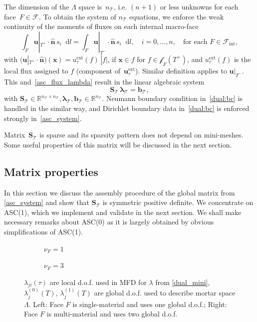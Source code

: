 \documentclass[12pt]{article}
\newcommand{\svginputw}[2][\linewidth]{\def\svgwidth{#1}} %
\newcommand{\vect}[1]{\boldsymbol{\mathbf{#1}}}
\newcommand{\bcell}{T}
\newcommand{\bmesh}{{\vect{\mathcal T}}}
\newcommand{\mmesh}{{\vect{\mathcal \tau}}}
\newcommand{\bfaces}[1][]{{\vect{\mathcal F}_{\text{#1}}}}
\newcommand{\mfaces}[1][]{{\vect{\mathcal f}_{\text{#1}}}}
\newcommand{\Rn}[1]{{\mathbb R^{#1}}}
\newcommand*\diff{\mathop{}\!\mathrm{d}}
\begin{document}
	The dimension of the $\Lambda$ space is~$n_\bmesh$, i.e. $(n+1)$ or less unknowns for each face~${F \in \bfaces}$.
	To obtain the system of $n_\bmesh$ equations, we enforce the weak continuity of the moments of  fluxes  on each internal macro-face
	\begin{equation}\label{flux_cont}
		\int_F \vect u|_{\bcell^+}\cdot\hat{\vect n}\,s_i \diff l = \int_F \vect u|_{\bcell^-}\cdot\hat{\vect n}\,s_i \diff l, \quad i = 0, \dots, n, \quad \text{for each } F \in \bfaces[int],
	\end{equation}
	with $\big(\vect u|_{\bcell^+}\cdot\hat{\vect n}\big)(\vect x) = u^\text{ext}_\mmesh(f)\,|f|$, if $\vect x \in f$ for $f\in\mfaces_F(T^+)$, and $u^\text{ext}_\mmesh(f)$ is the local flux assigned to $f$ (component of~$\vect u^\text{ext}_\mmesh$). Similar definition applies to $\vect u|_{\bcell^-}$. 	
	This and~\eqref{asc_flux_lambda} result in the linear algebraic system
	\begin{equation}\label{asc_system}
		\vect S_\bmesh\,{\vect \lambda}_\bmesh = {\vect b}_\bmesh,
	\end{equation}
	with	$\vect S_\bmesh \in \Rn{n_\bmesh \times n_\bmesh}, {\vect \lambda}_\bmesh, {\vect b}_\bmesh \in \Rn{n_\bmesh}$.
	Neumann boundary condition in~\eqref{dual:bc} is handled in the similar way, and Dirichlet boundary data in~\eqref{dual:bc} is enforced strongly in~\eqref{asc_system}.
	
	Matrix~$\vect S_\bmesh$ is sparse and its sparsity pattern does not depend on mini-meshes. Some useful properties of this matrix will be discussed in the next section.
	
	\subsection{Matrix properties}
	
	In this section we discuss the assembly procedure of the global matrix from \eqref{asc_system} and show that $\vect S_\bmesh$ is symmetric positive definite. We concentrate on ASC(1), which we implement and validate  in the next section. We shall make necessary remarks about ASC(0) as it is largely obtained by obvious simplifications of ASC(1).
	
	\begin{figure}[h]
		\centering		
		\begin{subfigure}{.45\linewidth}
			\centering
			\svginputw{e_plus_1.pdf_tex}
			\caption{$\nu_F = 1$}%
			\label{fig:asc_dofs:asc1:pc}
		\end{subfigure}%
		\qquad\quad
		\begin{subfigure}{.45\linewidth}
			\centering
			\svginputw{e_plus_2.pdf_tex}
			\caption{$\nu_F = 3$}		
		\end{subfigure}
		\caption{$\lambda_{ji}(\mmesh)$ are local d.o.f. used in MFD for $\lambda$ from \eqref{dual_mini}, $\lambda^{(0)}_j(T)$, $\lambda^{(1)}_j(T)$ are global d.o.f. used to describe mortar space $\Lambda$. Left: Face $F$ is single-material and uses one global d.o.f.; Right: Face $F$ is multi-material and uses two global d.o.f.
		\label{fig:asc_dofs:asc1:mmc}}
	\end{figure}
	
\end{document}
